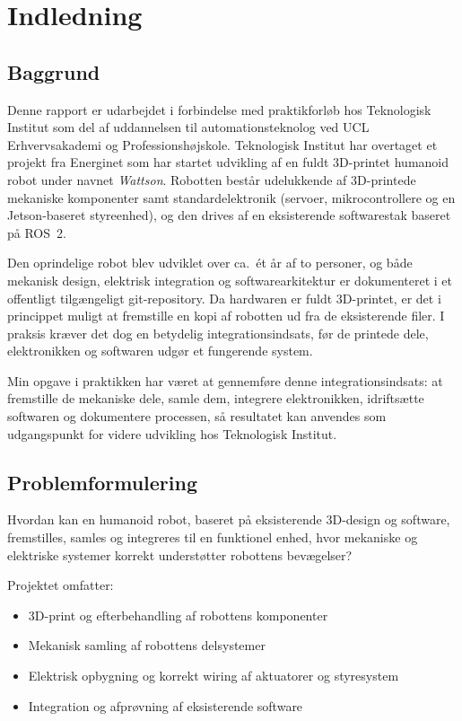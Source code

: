 \chapter{Indledning}
\label{ch:indledning}

\section{Baggrund}

Denne rapport er udarbejdet i forbindelse med praktikforløb hos Teknologisk
Institut som del af uddannelsen til automationsteknolog ved UCL Erhvervsakademi
og Professionshøjskole. Teknologisk Institut har overtaget et projekt fra Energinet som har startet udvikling af en fuldt 3D-printet humanoid robot under navnet \emph{Wattson}.
Robotten består udelukkende af 3D-printede mekaniske komponenter samt
standardelektronik (servoer, mikrocontrollere og en Jetson-baseret styreenhed),
og den drives af en eksisterende softwarestak baseret på ROS~2.

Den oprindelige robot blev udviklet over ca.\ ét år af to personer, og både
mekanisk design, elektrisk integration og softwarearkitektur er dokumenteret
i et offentligt tilgængeligt git-repository. Da hardwaren er fuldt 3D-printet,
er det i princippet muligt at fremstille en kopi af robotten ud fra de
eksisterende filer. I praksis kræver det dog en betydelig
integrationsindsats, før de printede dele, elektronikken og softwaren udgør
et fungerende system.

Min opgave i praktikken har været at gennemføre denne integrationsindsats:
at fremstille de mekaniske dele, samle dem, integrere elektronikken, idriftsætte
softwaren og dokumentere processen, så resultatet kan anvendes som udgangspunkt
for videre udvikling hos Teknologisk Institut.

\clearpage
\section{Problemformulering}

Hvordan kan en humanoid robot, baseret på eksisterende 3D-design og software,
fremstilles, samles og integreres til en funktionel enhed, hvor mekaniske og
elektriske systemer korrekt understøtter robottens bevægelser?

Projektet omfatter:

\begin{itemize}
    \item 3D-print og efterbehandling af robottens komponenter
    \item Mekanisk samling af robottens delsystemer
    \item Elektrisk opbygning og korrekt wiring af aktuatorer og styresystem
    \item Integration og afprøvning af eksisterende software
\end{itemize}

